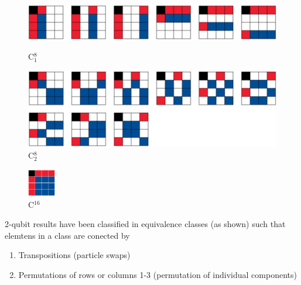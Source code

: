 \documentclass[11pt,dvipsnames]{article} %
\begin{document}
\begin{figure}[H] %
	\begin{minipage}[c]{0.5\textwidth}
		\centering
	  \includegraphics[width=.9\textwidth]
		{img/C18.png}
		\vspace{1.2cm}
		\caption{C${}_1^8$}
	\end{minipage}\hfill
	\begin{minipage}[c]{0.5\textwidth}
		\centering
	  \includegraphics[width=.9\textwidth]
		{img/C28.png}
		\caption{C${}_2^8$}
	\end{minipage}
\end{figure} %

\begin{figure}[H] %
	\centering
  \includegraphics[height=1.2cm]
	{img/C0.png}
	\caption{C${}^{16}$}
\end{figure} %

2-qubit results have been classified in equivalence classes (as shown) such
that elemtens in a class are conected by
\begin{enumerate}
	\item Transpositions (particle swaps)
	\item Permutations of rows or columns 1-3 (permutation of individual 
	components)
\end{enumerate}
\end{document}
